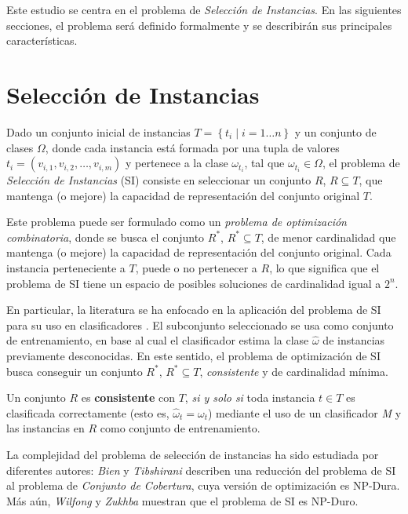 Este estudio se centra en el problema de \emph{Selección de Instancias}. En las siguientes secciones, el problema será definido formalmente y se describirán sus principales características.

\section{Selección de Instancias}

Dado un conjunto inicial de instancias $T = \left\{ t_i \mid i = 1 \dots n \right\}$ y un conjunto de clases $\Omega$, donde cada instancia está formada por una tupla de valores $t_i = (v_{i,1}, v_{i,2}, \dots, v_{i,m})$ y pertenece a la clase $\omega_{t_i}$, tal que $\omega_{t_i} \in \Omega$, el problema de \emph{Selección de Instancias} (SI) consiste en seleccionar un conjunto $R$, $R \subseteq T$, que mantenga (o mejore) la capacidad de representación del conjunto original $T$.

Este problema puede ser formulado como un \emph{problema de optimización combinatoria}, donde se busca el conjunto $R^*$, $R^* \subseteq T$, de menor cardinalidad que mantenga (o mejore) la capacidad de representación del conjunto original. Cada instancia perteneciente a $T$, puede o no pertenecer a $R$, lo que significa que el problema de SI tiene un espacio de posibles soluciones de cardinalidad igual a $2^n$.

En particular, la literatura se ha enfocado en la aplicación del problema de SI para su uso en clasificadores \cite{DBLP:journals/corr/GottliebK14,DBLP:conf/jcdcg/Toussaint02}. El subconjunto seleccionado se usa como conjunto de entrenamiento, en base al cual el clasificador estima la clase $\hat{\omega}$ de instancias previamente desconocidas. En este sentido, el problema de optimización de SI busca conseguir un conjunto $R^*$, $R^* \subseteq T$, \emph{consistente} y de cardinalidad mínima.\\

\begin{definicion}
Un conjunto $R$ es \textbf{consistente} con $T$, \emph{si y solo si} toda instancia $t \in T$ es clasificada correctamente (esto es, $\hat{\omega}_t = \omega_t$) mediante el uso de un clasificador \emph{M} y las instancias en $R$ como conjunto de entrenamiento.
\end{definicion}

La complejidad del problema de selección de instancias ha sido estudiada por diferentes autores: \emph{Bien} y \emph{Tibshirani} \cite{2012arXiv1202.5933B} describen una reducción del problema de SI al problema de \emph{Conjunto de Cobertura}, cuya versión de optimización es NP-Dura. Más aún, \emph{Wilfong} \cite{Wilfong:1991:NNP:109648.109673} y  \emph{Zukhba} \cite{Zukhba:2010:NPP:1921730.1921735} muestran que el problema de SI es NP-Duro.

